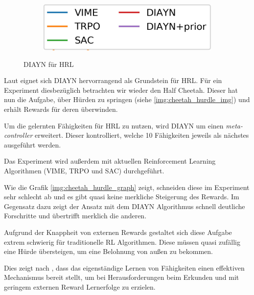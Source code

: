 \begin{figure}[h]
\begin{subfigure}{0.2\textwidth}
\includegraphics[width=\textwidth, keepaspectratio=true]{images/cheetah_hurdle_exp.JPG}
\end{subfigure}
\caption{DIAYN für HRL} \label{img:cheetah_hurdle}
\end{figure}

Laut \cite{diversity_eysenbach} eignet sich DIAYN hervorrangend als Grundstein für HRL. Für ein Experiment diesbezüglich betrachten wir wieder den Half Cheetah. Dieser hat nun die Aufgabe, über Hürden zu springen (siehe \ref{img:cheetah_hurdle_img}) und erhält Rewards für deren überwinden.

Um die gelernten Fähigkeiten für HRL zu nutzen, wird DIAYN um einen \textit{meta-controller} erweitert. Dieser kontrolliert, welche 10 Fähigkeiten jeweils als nächstes ausgeführt werden.

Das Experiment wird außerdem mit aktuellen Reinforcement Learning Algorithmen (VIME, TRPO und SAC) durchgeführt.

Wie die Grafik \ref{img:cheetah_hurdle_graph} zeigt, schneiden diese im Experiment sehr schlecht ab und es gibt quasi keine merkliche Steigerung des Rewards. Im Gegensatz dazu zeigt der Ansatz mit dem DIAYN Algorithmus schnell deutliche Forschritte und übertrifft merklich die anderen.

Aufgrund der Knappheit von externen Rewards gestaltet sich diese Aufgabe extrem schwierig für traditionelle RL Algorithmen. Diese müssen quasi zufällig eine Hürde übersteigen, um eine Belohnung von außen zu bekommen.

Dies zeigt nach \cite{diversity_eysenbach}, dass das eigenständige Lernen von Fähigkeiten einen effektiven Mechanismus bereit stellt, um bei Herausforderungen beim Erkunden und mit geringem externen Reward Lernerfolge zu erzielen.
